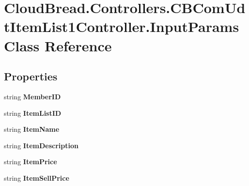 \hypertarget{a00094}{}\section{Cloud\+Bread.\+Controllers.\+C\+B\+Com\+Udt\+Item\+List1\+Controller.\+Input\+Params Class Reference}
\label{a00094}
\subsection*{Properties}
\begin{DoxyCompactItemize}
\item 
string {\bfseries Member\+ID}\hypertarget{a00094_aefe5c8c92140de3b72cc5033e2559b6c}{}\label{a00094_aefe5c8c92140de3b72cc5033e2559b6c}

\item 
string {\bfseries Item\+List\+ID}\hypertarget{a00094_a740d4e0657cb37f12bdacc6660d74bb5}{}\label{a00094_a740d4e0657cb37f12bdacc6660d74bb5}

\item 
string {\bfseries Item\+Name}\hypertarget{a00094_abd815de9bebbcc10271c255582122f39}{}\label{a00094_abd815de9bebbcc10271c255582122f39}

\item 
string {\bfseries Item\+Description}\hypertarget{a00094_aa656ee374dfa31edf29427c5cf130001}{}\label{a00094_aa656ee374dfa31edf29427c5cf130001}

\item 
string {\bfseries Item\+Price}\hypertarget{a00094_a8cd89b7b327e7645a9e8af4af477a5e0}{}\label{a00094_a8cd89b7b327e7645a9e8af4af477a5e0}

\item 
string {\bfseries Item\+Sell\+Price}\hypertarget{a00094_ad2c6aa992e02e7807d3b203b51990e44}{}\label{a00094_ad2c6aa992e02e7807d3b203b51990e44}


\end{DoxyCompactItemize}
